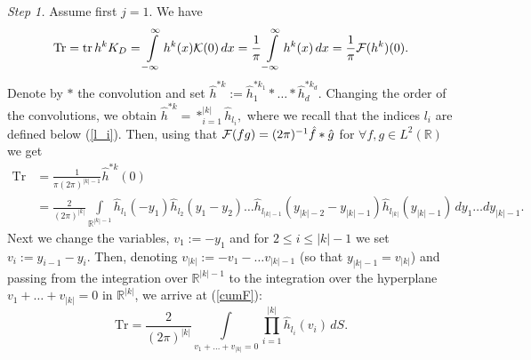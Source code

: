\documentclass{article}
\numberwithin{equation}{section}
\newcommand{\mR}{\mathbb{R}}
\newcommand{\FF}{{\cal F}}
\newcommand{\KK}{{\cal K}}
\newcommand{\tr}{\operatorname{tr}}
\newcommand{\fr}{\frac}
\newcommand{\ili}{\int\limits}
\newcommand{\ilif}{\ili_{-\infty}^\infty}
\newcommand{\non}{\nonumber}
\begin{document}
{\it Step 1.} Assume first $j=1$.
We have
$$
\mbox{Tr}
			=\tr h^k K_D
			=\ilif h^k(x) \KK(0)\, dx
			=\fr{1}{\pi}\ilif h^k(x)\, dx
			=\fr{1}{\pi}\FF(h^k)(0).
$$
Denote by $*$ the convolution
and set
$\hat h^{*k}:=\hat h_1^{*k_1}*\ldots*\hat h_d^{*k_d}$.
Changing the order of the convolutions, we obtain
$\hat h^{*k}=*_{i=1}^{|k|} \hat h_{l_i},$
where we recall that the indices $l_i$ are defined below (\ref{l_i}).
Then, using that
$\FF(fg)=(2\pi)^{-1}\hat f*\hat g$ for $\forall f,g\in L^2(\mR)$
we get
\begin{align}
\mbox{Tr}\non
			&=\fr{1}{\pi(2\pi)^{|k|-1}}\hat h^{*k}(0)
			\\ \non
			&=\fr{2}{(2\pi)^{|k|}} \ili_{\mR^{|k|-1}}
				\hat h_{l_1}(-y_1)\hat h_{l_2}(y_1-y_2)
				\ldots
				\hat h_{l_{|k|-1}}(y_{|k|-2}-y_{|k|-1})
				\hat h_{l_{|k|}}(y_{|k|-1})
				\,dy_1\ldots dy_{|k|-1}.
\end{align}
Next we change the variables,
$v_1:=-y_1$
and
for $2\leq i \leq |k|-1$
we set
$v_i:=y_{i-1}-y_{i}$.
Then, denoting
$v_{|k|}:=-v_1-\ldots v_{|k|-1}$
(so that $y_{|k|-1}=v_{|k|}$)
and passing from the integration over $\mR^{|k|-1}$
to the integration over the hyperplane
$v_1+\ldots+ v_{|k|}=0$ in $\mR^{|k|}$,
we arrive at (\ref{cumF}):
$$
\mbox{Tr}
			=\fr{2}{(2\pi)^{|k|}} \ili_{v_1+\ldots+ v_{|k|}=0}
					 \prod\limits_{i=1}^{|k|} \hat h_{l_i}(v_i)
						\,dS.
$$
\end{document}

